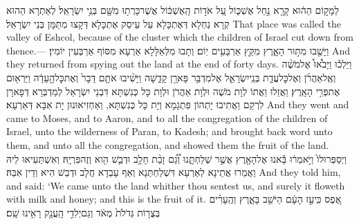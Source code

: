 {לַמָּק֣וֹם הַה֔וּא קָרָ֖א נַ֣חַל אֶשְׁכּ֑וֹל עַ֚ל אֹד֣וֹת הָֽאֶשְׁכּ֔וֹל אֲשֶׁר\maqqaf כָּרְת֥וּ מִשָּׁ֖ם בְּנֵ֥י יִשְׂרָאֵֽל׃}
{לְאַתְרָא הַהוּא קְרָא נַחְלָא דְּאֶתְכָּלָא עַל עֵיסַק אֶתְכָּלָא דְּקָצוּ מִתַּמָּן בְּנֵי יִשְׂרָאֵל׃}
{That place was called the valley of Eshcol, because of the cluster which the children of Israel cut down from thence.—}{}
{וַיָּשֻׁ֖בוּ מִתּ֣וּר הָאָ֑רֶץ מִקֵּ֖ץ אַרְבָּעִ֥ים יֽוֹם׃}
{וְתָבוּ מִלְּאַלָּלָא אַרְעָא מִסּוֹף אַרְבְּעִין יוֹמִין׃}
{And they returned from spying out the land at the end of forty days.}{}
{וַיֵּלְכ֡וּ וַיָּבֹ֩אוּ֩ אֶל\maqqaf מֹשֶׁ֨ה וְאֶֽל\maqqaf אַהֲרֹ֜ן וְאֶל\maqqaf כׇּל\maqqaf עֲדַ֧ת בְּנֵֽי\maqqaf יִשְׂרָאֵ֛ל אֶל\maqqaf מִדְבַּ֥ר פָּארָ֖ן קָדֵ֑שָׁה וַיָּשִׁ֨יבוּ אֹתָ֤ם דָּבָר֙ וְאֶת\maqqaf כׇּל\maqqaf הָ֣עֵדָ֔ה וַיַּרְא֖וּם אֶת\maqqaf פְּרִ֥י הָאָֽרֶץ׃}
{ וַאֲזַלוּ וַאֲתוֹ לְוָת מֹשֶׁה וּלְוָת אַהֲרֹן וּלְוָת כָּל כְּנִשְׁתָּא דִּבְנֵי יִשְׂרָאֵל לְמַדְבְּרָא דְּפָארָן לִרְקַם וַאֲתִיבוּ יָתְהוֹן פִּתְגָמָא וְיָת כָּל כְּנִשְׁתָּא, וְאַחְזִיאוּנוּן יָת אִבָּא דְּאַרְעָא׃}
{And they went and came to Moses, and to Aaron, and to all the congregation of the children of Israel, unto the wilderness of Paran, to Kadesh; and brought back word unto them, and unto all the congregation, and showed them the fruit of the land.}{}
{וַיְסַפְּרוּ\maqqaf לוֹ֙ וַיֹּ֣אמְר֔וּ בָּ֕אנוּ אֶל\maqqaf הָאָ֖רֶץ אֲשֶׁ֣ר שְׁלַחְתָּ֑נוּ וְ֠גַ֠ם זָבַ֨ת חָלָ֥ב וּדְבַ֛שׁ הִ֖וא וְזֶה\maqqaf פִּרְיָֽהּ׃}
{וְאִשְׁתַּעִיאוּ לֵיהּ וַאֲמַרוּ אֲתֵינָא לְאַרְעָא דִּשְׁלַחְתַּנָא וְאַף עָבְדָא חֲלָב וּדְבַשׁ הִיא וְדֵין אִבַּהּ׃}
{And they told him, and said: ‘We came unto the land whither thou sentest us, and surely it floweth with milk and honey; and this is the fruit of it.}{}
{אֶ֚פֶס כִּֽי\maqqaf עַ֣ז הָעָ֔ם הַיֹּשֵׁ֖ב בָּאָ֑רֶץ וְהֶֽעָרִ֗ים בְּצֻר֤וֹת גְּדֹלֹת֙ מְאֹ֔ד וְגַם\maqqaf יְלִדֵ֥י הָֽעֲנָ֖ק רָאִ֥ינוּ שָֽׁם׃}
